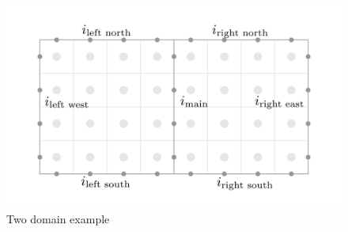 \documentclass[12pt]{article}
\begin{document}
\begin{figure}[H]
    \centering
    \includegraphics[width=6in]{images/2domain.pdf}
    \caption{Two domain example}
    \label{2domain}
\end{figure}

%
%
\end{document}
